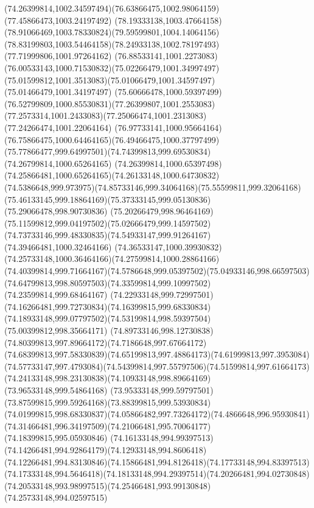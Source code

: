 {{		\curveto(74.26399814,1002.34597494)(76.63866475,1002.98064159)(77.45866473,1003.24197492)
		\curveto(78.19333138,1003.47664158)(78.91066469,1003.78330824)(79.59599801,1004.14064156)
		\curveto(78.83199803,1003.54464158)(78.24933138,1002.78197493)(77.71999806,1001.97264162)
		\curveto(76.88533141,1001.2273083)(76.00533143,1000.71530832)(75.02266479,1001.34997497)
		\curveto(75.01599812,1001.3513083)(75.01066479,1001.34597497)(75.01466479,1001.34197497)
		\curveto(75.60666478,1000.59397499)(76.52799809,1000.85530831)(77.26399807,1001.2553083)
		\curveto(77.2573314,1001.2433083)(77.25066474,1001.2313083)(77.24266474,1001.22064164)
		\curveto(76.97733141,1000.95664164)(76.75866475,1000.64464165)(76.49466475,1000.37797499)
		\curveto(75.77866477,999.64997501)(74.74399813,999.69530834)(74.26799814,1000.65264165)
		\curveto(74.26399814,1000.65397498)(74.25866481,1000.65264165)(74.26133148,1000.64730832)
		\curveto(74.5386648,999.973975)(74.85733146,999.34064168)(75.55599811,999.32064168)
		\curveto(75.46133145,999.18864169)(75.37333145,999.05130836)(75.29066478,998.90730836)
		\curveto(75.20266479,998.96464169)(75.11599812,999.04197502)(75.02666479,999.14597502)
		\curveto(74.73733146,999.48330835)(74.54933147,999.91264167)(74.39466481,1000.32464166)
		\curveto(74.36533147,1000.39930832)(74.25733148,1000.36464166)(74.27599814,1000.28864166)
		\curveto(74.40399814,999.71664167)(74.5786648,999.05397502)(75.04933146,998.66597503)
		\curveto(74.64799813,998.80597503)(74.33599814,999.10997502)(74.23599814,999.68464167)
		\curveto(74.22933148,999.72997501)(74.16266481,999.72730834)(74.16399815,999.68330834)
		\curveto(74.18933148,999.07797502)(74.53199814,998.59397504)(75.00399812,998.35664171)
		\curveto(74.89733146,998.12730838)(74.80399813,997.89664172)(74.7186648,997.67664172)
		\curveto(74.68399813,997.58330839)(74.65199813,997.48864173)(74.61999813,997.3953084)
		\curveto(74.57733147,997.4793084)(74.54399814,997.55797506)(74.51599814,997.61664173)
		\curveto(74.24133148,998.23130838)(74.10933148,998.89664169)(73.96533148,999.54864168)
		\curveto(73.95333148,999.59797501)(73.87599815,999.59264168)(73.88399815,999.53930834)
		\curveto(74.01999815,998.68330837)(74.05866482,997.73264172)(74.4866648,996.95930841)
		\curveto(74.31466481,996.34197509)(74.21066481,995.70064177)(74.18399815,995.05930846)
		\curveto(74.16133148,994.99397513)(74.14266481,994.92864179)(74.12933148,994.8606418)
		\curveto(74.12266481,994.83130846)(74.15866481,994.8126418)(74.17733148,994.83397513)
		\curveto(74.17333148,994.5646418)(74.18133148,994.29397514)(74.20266481,994.02730848)
		\curveto(74.20533148,993.98997515)(74.25466481,993.99130848)(74.25733148,994.02597515)
}}
